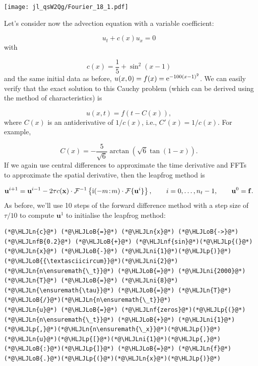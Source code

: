 \documentclass[12pt,landscape]{article}
\newcommand{\HLJLn}[1]{#1}
\newcommand{\HLJLnf}[1]{\textcolor[RGB]{66,102,213}{#1}}
\newcommand{\HLJLnfB}[1]{\textcolor[RGB]{59,151,46}{#1}}
\newcommand{\HLJLni}[1]{\textcolor[RGB]{59,151,46}{#1}}
\newcommand{\HLJLoB}[1]{\textcolor[RGB]{102,102,102}{\textbf{#1}}}
\newcommand{\HLJLp}[1]{#1}
\begin{document}
{\texttt{[image: jl\_qsW2Qg/Fourier\_18\_1.pdf]}

Let's consider now the advection equation with a variable coefficient:

\[
u_t + c(x)u_x = 0
\]
with 

\[
c(x) = \frac{1}{5} + \sin^2(x-1)
\]
and the same initial data as before, $u(x,0) = f(x) = {\rm e}^{-100(x-1)^2}$.  We can easily verify that the exact solution to this Cauchy problem (which can be derived using the method of characteristics) is 

\[
u(x,t) = f\left(t - C(x)  \right),
\]
where $C(x)$ is an antiderivative of $1/c(x)$, i.e., $C'(x) = 1/c(x)$.    For example,

\[
C(x) = -\frac{5}{\sqrt{6}}\arctan \left(\sqrt{6}\tan(1-x)  \right).
\]
If we again use central differences to approximate the time derivative and FFTs to approximate the spatial derivative, then the leapfrog method is

\[
\mathbf{u}^{i+1} = \mathbf{u}^{i-1} - 2\tau c(\mathbf{x})\cdot \mathcal{F}^{-1}\left\lbrace {\rm i}(-m\!:\!m)\cdot\mathcal{F}\lbrace \mathbf{u}^{i} \rbrace\right\rbrace, \qquad i = 0, \ldots, n_t-1, \qquad \mathbf{u}^0 = \mathbf{f}.
\]
As before, we'll use 10 steps of the forward difference method with a step size of $\tau/10$ to compute $\mathbf{u}^{1}$ to initialise the leapfrog method:


\begin{lstlisting}
(*@\HLJLn{c}@*) (*@\HLJLoB{=}@*) (*@\HLJLn{x}@*) (*@\HLJLoB{->}@*) (*@\HLJLnfB{0.2}@*) (*@\HLJLoB{+}@*) (*@\HLJLnf{sin}@*)(*@\HLJLp{(}@*)(*@\HLJLn{x}@*) (*@\HLJLoB{-}@*) (*@\HLJLni{1}@*)(*@\HLJLp{)}@*)(*@\HLJLoB{{\textasciicircum}}@*)(*@\HLJLni{2}@*)
(*@\HLJLn{n\ensuremath{\_t}}@*) (*@\HLJLoB{=}@*) (*@\HLJLni{2000}@*)
(*@\HLJLn{T}@*) (*@\HLJLoB{=}@*) (*@\HLJLni{8}@*)
(*@\HLJLn{\ensuremath{\tau}}@*) (*@\HLJLoB{=}@*) (*@\HLJLn{T}@*)(*@\HLJLoB{/}@*)(*@\HLJLn{n\ensuremath{\_t}}@*)
(*@\HLJLn{u}@*) (*@\HLJLoB{=}@*) (*@\HLJLnf{zeros}@*)(*@\HLJLp{(}@*)(*@\HLJLn{n\ensuremath{\_t}}@*) (*@\HLJLoB{+}@*) (*@\HLJLni{1}@*)(*@\HLJLp{,}@*)(*@\HLJLn{n\ensuremath{\_x}}@*)(*@\HLJLp{)}@*)
(*@\HLJLn{u}@*)(*@\HLJLp{[}@*)(*@\HLJLni{1}@*)(*@\HLJLp{,}@*)(*@\HLJLoB{:}@*)(*@\HLJLp{]}@*) (*@\HLJLoB{=}@*) (*@\HLJLn{f}@*)(*@\HLJLoB{.}@*)(*@\HLJLp{(}@*)(*@\HLJLn{x}@*)(*@\HLJLp{)}@*) 


\end{lstlisting}}
\end{document}
